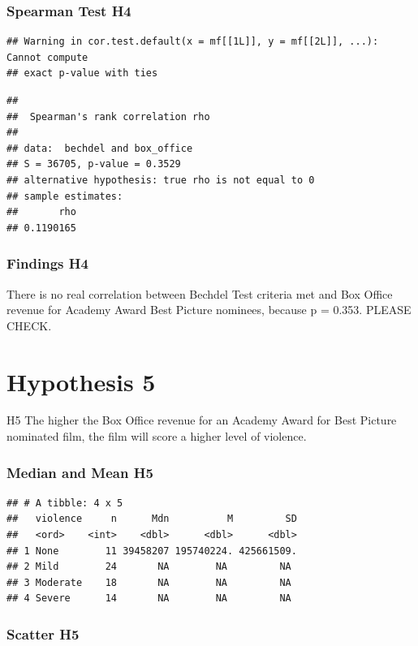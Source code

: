\documentclass[
]{article}
\begin{document}
\subsubsection{Spearman Test H4}\label{spearman-test-h4}

\begin{verbatim}
## Warning in cor.test.default(x = mf[[1L]], y = mf[[2L]], ...): Cannot compute
## exact p-value with ties
\end{verbatim}

\begin{verbatim}
## 
##  Spearman's rank correlation rho
## 
## data:  bechdel and box_office
## S = 36705, p-value = 0.3529
## alternative hypothesis: true rho is not equal to 0
## sample estimates:
##       rho 
## 0.1190165
\end{verbatim}

\subsubsection{Findings H4}\label{findings-h4}

There is no real correlation between Bechdel Test criteria met and Box
Office revenue for Academy Award Best Picture nominees, because p =
0.353. PLEASE CHECK.

\section{Hypothesis 5}\label{hypothesis-5}

H5 The higher the Box Office revenue for an Academy Award for Best
Picture nominated film, the film will score a higher level of violence.

\subsubsection{Median and Mean H5}\label{median-and-mean-h5}

\begin{verbatim}
## # A tibble: 4 x 5
##   violence     n      Mdn          M         SD
##   <ord>    <int>    <dbl>      <dbl>      <dbl>
## 1 None        11 39458207 195740224. 425661509.
## 2 Mild        24       NA        NA         NA 
## 3 Moderate    18       NA        NA         NA 
## 4 Severe      14       NA        NA         NA
\end{verbatim}

\subsubsection{Scatter H5}\label{scatter-h5}
\end{document}
